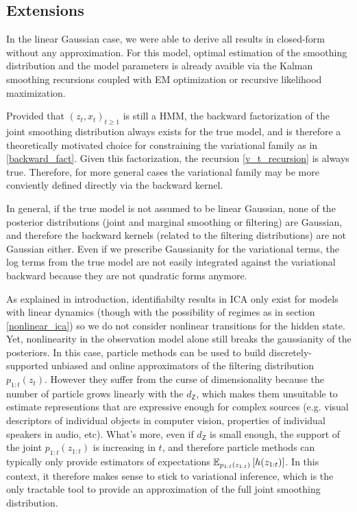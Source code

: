 \documentclass{article}
\begin{document}
\subsection{Extensions}

In the linear Gaussian case, we were able to derive all results in closed-form without any approximation. For this model, optimal estimation of the smoothing distribution and the model parameters is already avaible via the Kalman smoothing recursions coupled with EM optimization or recursive likelihood maximization. 

Provided that $(z_t,x_t)_{t \geq 1}$ is still a HMM, the backward factorization of the joint smoothing distribution always exists for the true model, and is therefore a theoretically motivated choice for constraining the variational family as in \ref{backward_fact}. Given this factorization, the recursion \ref{v_t_recursion} is always true. Therefore, for more general cases the variational family may be more conviently defined directly via the backward kernel. 

In general, if the true model is not assumed to be linear Gaussian, none of the posterior distributions (joint and marginal smoothing or filtering) are Gaussian, and therefore the backward kernels (related to the filtering distributions) are not Gaussian either. Even if we prescribe Gaussianity for the variational terms, the log terms from the true model are not easily integrated against the variational backward because they are not quadratic forms anymore. 

As explained in introduction, identifiabilty results in ICA only exist for models with linear dynamics (though with the possibility of regimes as in section \ref{nonlinear_ica}) so we do not consider nonlinear transitions for the hidden state. Yet, nonlinearity in the observation model alone still breaks the gaussianity of the posteriors. In this case, particle methods can be used to build discretely-supported unbiased and online approximators of the filtering distribution $p_{1:t}(z_t)$. However they suffer from the curse of dimensionality because the number of particle grows linearly with the $d_{\mathsf{Z}}$, which makes them unsuitable to estimate representions that are expressive enough for complex sources (e.g. visual descriptors of individual objects in computer vision, properties of individual speakers in audio, etc). What's more, even if $d_{\mathsf{Z}}$ is small enough, the support of the joint $p_{1:t}(z_{1:t})$ is increasing in $t$, and therefore particle methods can typically only provide estimators of expectations $\mathbb{E}_{p_{1:t}(z_{1:t})}\left[h(z_{1:t})\right]$. In this context, it therefore makes sense to stick to variational inference, which is the only tractable tool to provide an approximation of the full joint smoothing distribution. 
\end{document}
